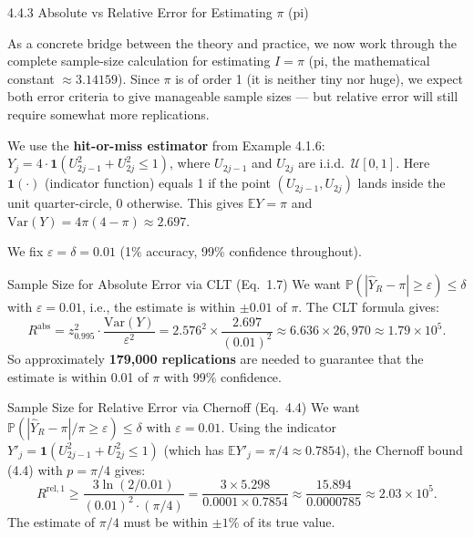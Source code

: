 \documentclass[aspectratio=169,10pt]{beamer}
\begin{document}
\begin{frame}[allowframebreaks]{4.4.3 Absolute vs Relative Error for Estimating $\pi$ (pi)}

As a concrete bridge between the theory and practice, we now work through the
complete sample-size calculation for estimating $I = \pi$ (pi, the mathematical
constant $\approx 3.14159$).  Since $\pi$ is of order 1 (it is neither tiny
nor huge), we expect both error criteria to give manageable sample sizes ---
but relative error will still require somewhat more replications.

We use the \textbf{hit-or-miss estimator} from Example 4.1.6:
$Y_j = 4 \cdot \mathbf{1}(U_{2j-1}^2 + U_{2j}^2 \leq 1)$,
where $U_{2j-1}$ and $U_{2j}$ are i.i.d.\ $\mathcal{U}[0,1]$.
Here $\mathbf{1}(\cdot)$ (indicator function) equals 1 if the point
$(U_{2j-1}, U_{2j})$ lands inside the unit quarter-circle, 0 otherwise.
This gives $\mathbb{E}Y = \pi$ and $\mathrm{Var}(Y) = 4\pi(4-\pi) \approx 2.697$.

We fix $\varepsilon = \delta = 0.01$ (1\% accuracy, 99\% confidence throughout).

\begin{block}{Sample Size for Absolute Error via CLT (Eq.\ 1.7)}
  We want $\mathbb{P}(|\hat{Y}_R - \pi| \geq \varepsilon) \leq \delta$
  with $\varepsilon = 0.01$, i.e., the estimate is within $\pm 0.01$ of $\pi$.
  The CLT formula gives:
  \[
    R^{\mathrm{abs}} = z_{0.995}^2 \cdot \frac{\mathrm{Var}(Y)}{\varepsilon^2}
      = 2.576^2 \times \frac{2.697}{(0.01)^2}
      \approx 6.636 \times 26{,}970
      \approx 1.79 \times 10^5.
  \]
  So approximately \textbf{179,000 replications} are needed to guarantee that
  the estimate is within 0.01 of $\pi$ with 99\% confidence.
\end{block}

\begin{block}{Sample Size for Relative Error via Chernoff (Eq.\ 4.4)}
  We want $\mathbb{P}(|\hat{Y}_R - \pi|/\pi \geq \varepsilon) \leq \delta$
  with $\varepsilon = 0.01$.  Using the indicator $Y'_j = \mathbf{1}(U_{2j-1}^2+U_{2j}^2\leq 1)$
  (which has $\mathbb{E}Y'_j = \pi/4 \approx 0.7854$), the Chernoff bound (4.4)
  with $p = \pi/4$ gives:
  \[
    R^{\mathrm{rel,1}} \geq \frac{3\ln(2/0.01)}{(0.01)^2 \cdot (\pi/4)}
      = \frac{3 \times 5.298}{0.0001 \times 0.7854}
      \approx \frac{15.894}{0.0000785}
      \approx 2.03 \times 10^5.
  \]
  The estimate of $\pi/4$ must be within $\pm 1\%$ of its true value.
\end{block}


\end{frame}
\end{document}
